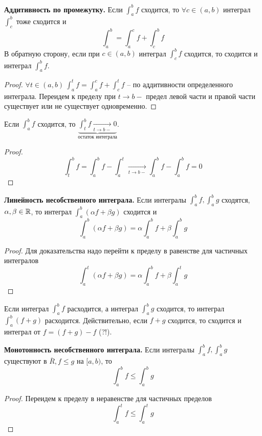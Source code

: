 \begin{MyList}
	\item \textbf{Аддитивность по промежутку.}  Если $\int_a^b f$ сходится, то $\forall c \in (a, b)$ интеграл $\int_c^b$ тоже сходится и
	\[\int_a^b = \int_a^c f + \int_c^b f\]	
	В обратную сторону, если при $c \in (a, b)$ интеграл $\int_c^b f$ сходится, то сходится и интеграл $\int_a^b f$.
	\begin{proof}
		$\forall t \in (a, b) \ \int_a^t f = \int_a^c f + \int_c^t f$ -- по аддитивности определенного интеграла.
		Переидем к пределу при $t \to b-$ предел левой части и правой части существует или не существует одновременно.
	\end{proof}

	\item Если $\int_a^b f$ сходится, то $\underbrace{\int_t^b f \xrightarrow[t \to b-]{} 0}_{\text{остаток интеграла}}$.
	\begin{proof}
		\[\int_t^b f = \int_a^b f - \int_a^t \xrightarrow[t \to b-]{}\int_a^b f - \int_a^b f = 0\]
	\end{proof}

	\item \textbf{Линейность несобственного интеграла.}  Если интегралы $\int_a^b f, \int_a^b g$ сходятся, $\alpha, \beta \in \mathbb{R}$, то интеграл $\int_a^b(\alpha f + \beta g)$ сходится и
	\[\int_a^b (\alpha f + \beta g) = \alpha\int_a^b f + \beta\int_a^b g\]
	\begin{proof}
		Для доказательства надо перейти к пределу в равенстве для частичных интегралов
		\[\int_a^t (\alpha f + \beta g) = \alpha \int_a^b f + \beta \int_a^t g\]
	\end{proof}

	\begin{Rem}
		Если интеграл $\int_a^b f$ расходится, а интеграл $\int_a^b g$ сходится, то интеграл $\int_a^b(f + g)$ расходится.
		Действительно, если $f + g$ сходится, то сходится и интеграл от $f = (f + g) - f$ (?!).
	\end{Rem}

	\item \textbf{Монотонность несобственного интеграла.} Если интегралы $\int_a^b f, \int_a^b g$ существуют в $\overline{R}, f \leqslant g$ на $[a, b)$, то
	\[\int_a^b f \leqslant \int_a^b g\]

	\begin{proof}
		Переидем к пределу в неравенстве для частичных пределов
		\[\int_a^t f \leqslant \int_a^t g\]	
	\end{proof}


\end{MyList}
